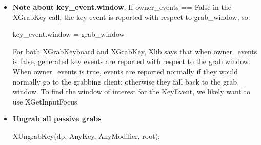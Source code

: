 \documentclass{report}
\begin{document}
\begin{itemize}
\begin{cppcode}
                ...
                for (;;) {
                    XEvent event;
                    XNextEvent(dp, &event);

                    if (event.type == KeyPress) {
                        XKeyEvent* key_event = &event.xkey;

                        // Check key_event->keycode and key_event->state
                        // against the mapping we defined above.
                    }
                }
            \end{cppcode}
        \item \textbf{Note about key\_event.window}: If owner\_events == False in the XGrabKey call, the key event is reported with respect to grab\_window, so:
            \bigbreak \noindent 
            \begin{cppcode}
            key_event.window = grab_window
            \end{cppcode}
            \bigbreak \noindent 
            For both XGrabKeyboard and XGrabKey, Xlib says that when owner\_events is false, generated key events are reported with respect to the grab window. When owner\_events is true, events are reported normally if they would normally go to the grabbing client; otherwise they fall back to the grab window.
            \bigbreak \noindent 
            To find the window of interest for the KeyEvent, we likely want to use XGetInputFocus
        \item \textbf{Ungrab all passive grabs}
            \bigbreak \noindent 
            \begin{cppcode}
            XUngrabKey(dp, AnyKey, AnyModifier, root);
            \end{cppcode}


    \end{itemize}

    \pagebreak 
\end{document}
